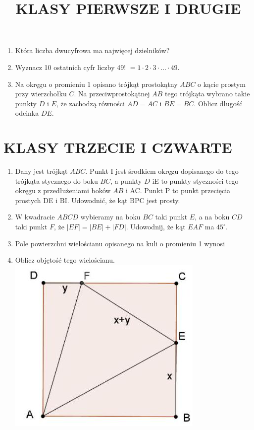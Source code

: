 \documentclass[10pt]{article}
\title{KLASY PIERWSZE I DRUGIE }
\author{}
\date{}
\begin{document}
\maketitle
\begin{enumerate}
  \item Która liczba dwucyfrowa ma najwięcej dzielników?
  \item Wyznacz 10 ostatnich cyfr liczby 49! \(=1 \cdot 2 \cdot 3 \cdot \ldots \cdot 49\).
  \item Na okręgu o promieniu 1 opisano trójkąt prostokątny \(A B C\) o kącie prostym przy wierzchołku \(C\). Na przeciwprostokątnej \(A B\) tego trójkąta wybrano takie punkty \(D\) i \(E\), że zachodzą równości \(A D=A C\) i \(B E=B C\). Oblicz długość odcinka \(D E\).
\end{enumerate}

\section*{KLASY TRZECIE I CZWARTE}
\begin{enumerate}
  \item Dany jest trójkąt \(A B C\). Punkt I jest środkiem okręgu dopisanego do tego trójkąta stycznego do boku \(B C\), a punkty \(D\) iE to punkty styczności tego okręgu z przedłużeniami boków \(A B\) i AC. Punkt P to punkt przecięcia prostych DE i BI. Udowodnić, że kąt BPC jest prosty.
  \item W kwadracie \(A B C D\) wybieramy na boku \(B C\) taki punkt \(E\), a na boku \(C D\) taki punkt \(F\), że \(|E F|=|B E|+|F D|\). Udowodnij, że kąt \(E A F\) ma \(45^{\circ}\).
  \item Pole powierzchni wielościanu opisanego na kuli o promieniu 1 wynosi
  \item Oblicz objętość tego wielościanu.\\
\includegraphics[max width=\textwidth, center]{2024_11_21_57e534bd5e068781e5c7g-1}
\end{enumerate}
\end{document}
